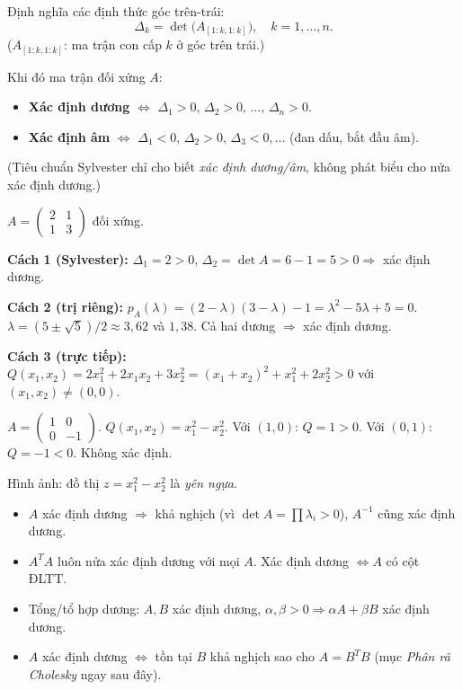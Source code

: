 \documentclass[12pt,a4paper]{article}
\begin{document}
\begin{dinhly}[title={Tiêu chuẩn Sylvester (định thức góc)}]
Định nghĩa các định thức góc trên-trái:
\[
  \Delta_k = \det\bigl(A_{[1:k, 1:k]}\bigr),\quad k = 1, \ldots, n.
\]
($A_{[1:k,1:k]}$: ma trận con cấp $k$ ở góc trên trái.)

Khi đó ma trận đối xứng $A$:
\begin{itemize}
  \item \textbf{Xác định dương} $\Leftrightarrow$ $\Delta_1 > 0,\, \Delta_2 > 0,\, \ldots,\, \Delta_n > 0$.
  \item \textbf{Xác định âm} $\Leftrightarrow$ $\Delta_1 < 0,\, \Delta_2 > 0,\, \Delta_3 < 0, \ldots$ (đan dấu, bắt đầu âm).
\end{itemize}
(Tiêu chuẩn Sylvester chỉ cho biết \emph{xác định dương/âm}, không phát biểu cho nửa xác định dương.)
\end{dinhly}

\begin{vidu}[title={Kiểm tra ma trận xác định dương}]
$A = \begin{pmatrix}2 & 1\\ 1 & 3\end{pmatrix}$ đối xứng.

\textbf{Cách 1 (Sylvester):} $\Delta_1 = 2 > 0$, $\Delta_2 = \det A = 6 - 1 = 5 > 0 \Rightarrow$ xác định dương.

\textbf{Cách 2 (trị riêng):} $p_A(\lambda) = (2-\lambda)(3-\lambda) - 1 = \lambda^2 - 5\lambda + 5 = 0$. $\lambda = (5 \pm \sqrt{5})/2 \approx 3{,}62$ và $1{,}38$. Cả hai dương $\Rightarrow$ xác định dương.

\textbf{Cách 3 (trực tiếp):} $Q(x_1, x_2) = 2x_1^2 + 2x_1 x_2 + 3 x_2^2 = (x_1 + x_2)^2 + x_1^2 + 2x_2^2 > 0$ với $(x_1, x_2) \ne (0,0)$.
\end{vidu}

\begin{vidu}[title={Không xác định}]
$A = \begin{pmatrix}1 & 0\\ 0 & -1\end{pmatrix}$. $Q(x_1, x_2) = x_1^2 - x_2^2$. Với $(1,0)$: $Q = 1 > 0$. Với $(0, 1)$: $Q = -1 < 0$. Không xác định.

Hình ảnh: đồ thị $z = x_1^2 - x_2^2$ là \emph{yên ngựa}.
\end{vidu}

\begin{tinhchat}
\begin{itemize}
  \item $A$ xác định dương $\Rightarrow$ khả nghịch (vì $\det A = \prod \lambda_i > 0$), $A^{-1}$ cũng xác định dương.
  \item $A^T A$ luôn nửa xác định dương với mọi $A$. Xác định dương $\Leftrightarrow A$ có cột ĐLTT.
  \item Tổng/tổ hợp dương: $A, B$ xác định dương, $\alpha, \beta > 0 \Rightarrow \alpha A + \beta B$ xác định dương.
  \item $A$ xác định dương $\Leftrightarrow$ tồn tại $B$ khả nghịch sao cho $A = B^T B$ (mục \emph{Phân rã Cholesky} ngay sau đây).
\end{itemize}
\end{tinhchat}
\end{document}
